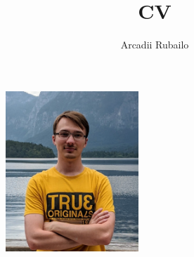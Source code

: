 \documentclass[12pt, a4paper]{article}
\title{CV}
\author{Arcadii Rubailo}
\begin{document}
\begin{figure}[th]
    \includegraphics[width=5cm]{profile.jpg}
\end{figure}
\end{document}
